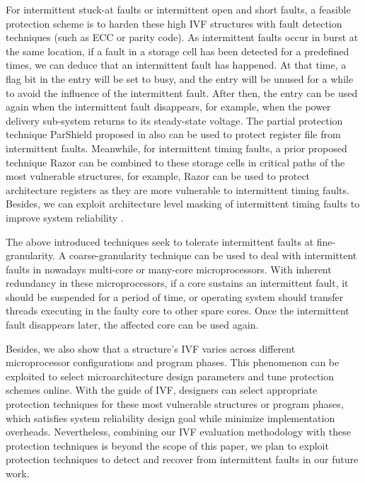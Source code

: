 For intermittent stuck-at faults or intermittent open and short faults, a feasible protection scheme is to harden these high IVF structures with fault detection techniques (such as ECC or parity code). As intermittent faults occur in burst at the same location, if a fault in a storage cell has been detected for a predefined times, we can deduce that an intermittent fault has happened. At that time, a flag bit in the entry will be set to busy, and the entry will be unused for a while to avoid the influence of the intermittent fault. After then, the entry can be used again when the intermittent fault disappears, for example, when the power delivery sub-system returns to its steady-state voltage. The partial protection technique ParShield proposed in \cite{Using_Register_Lifetime_dsn07} also can be used to protect register file from intermittent faults. Meanwhile, for intermittent timing faults, a prior proposed technique Razor \cite{Dan_Micro03} can be combined to these storage cells in critical paths of the most vulnerable structures, for example, Razor can be used to protect architecture registers as they are more vulnerable to intermittent timing faults. Besides, we can exploit architecture level masking of intermittent timing faults to improve system reliability \cite{pan2011cost}.

The above introduced techniques seek to tolerate intermittent faults at fine-granularity. A coarse-granularity technique can be used to deal with intermittent faults in nowadays multi-core or many-core microprocessors. With inherent redundancy in these microprocessors, if a core sustains an intermittent fault, it should be suspended for a period of time, or operating system should transfer threads executing in the faulty core to other spare cores. Once the intermittent fault disappears later, the affected core can be used again.

Besides, we also show that a structure’s IVF varies across different microprocessor configurations and program phases. This phenomenon can be exploited to select microarchitecture design parameters and tune protection schemes online. With the guide of IVF, designers can select appropriate protection techniques for these most vulnerable structures or program phases, which satisfies system reliability design goal while minimize implementation overheads. Nevertheless, combining our IVF evaluation methodology with these protection techniques is beyond the scope of this paper, we plan to exploit protection techniques to detect and recover from intermittent faults in our future work.

